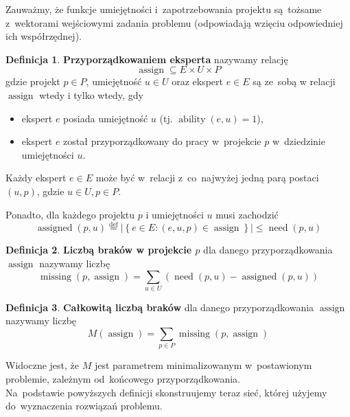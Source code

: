 \documentclass[12pt,a4paper]{article}
\theoremstyle{definition}
\newtheorem{defn}{Definicja}
\DeclareMathOperator{\ability}{ability}
\DeclareMathOperator{\need}{need}
\DeclareMathOperator{\assign}{assign}
\DeclareMathOperator{\assigned}{assigned}
\DeclareMathOperator{\missing}{missing}
\begin{document}
\noindent
Zauważmy, że funkcje umiejętności i~zapotrzebowania projektu są~tożsame
z~wektorami wejściowymi zadania problemu (odpowiadają wzięciu odpowiedniej
ich współrzędnej).

\begin{defn}
\label{defn:assign}
\textbf{Przyporządkowaniem eksperta} nazywamy relację
$$ \assign \subseteq E \times U \times P $$
gdzie projekt $p \in P$, umiejętność $u \in U$ oraz ekspert $e \in E$ są
ze~sobą w relacji $\assign$ wtedy i tylko wtedy, gdy
\begin{itemize}
	\item ekspert $e$ posiada umiejętność $u$ (tj. $\ability(e,u) = 1$),
	\item ekspert $e$ został przyporządkowany do pracy w~projekcie $p$
	w~dziedzinie umiejętności $u$.
\end{itemize}
Każdy ekspert $e \in E$ może być w~relacji z~co~najwyżej jedną parą postaci
$(u,p)$, gdzie $u \in U, p \in P$.

\noindent
Ponadto, dla każdego projektu $p$ i umiejętności $u$ musi zachodzić
$$\assigned(p,u) \overset{\text{def}}{=} \left| \left\lbrace e \in E : (e,u,p)
\in \assign \right\rbrace \right| \leq \need(p,u)$$
\end{defn}

\begin{defn}
\label{defn:missing}
\textbf{Liczbą braków w projekcie $p$} dla danego przyporządkowania $\assign$
nazywamy liczbę
$$ \missing(p,\assign) = \sum_{u \in U} \left( \need(p,u) - 
\assigned(p, u)\right) $$
\end{defn}

\begin{defn}
\textbf{Całkowitą liczbą braków} dla danego przyporządkowania $\assign$ nazywamy
liczbę
$$ M(\assign) = \sum_{p \in P} \missing(p, \assign) $$
\end{defn}

\noindent
Widoczne jest, że $M$ jest parametrem minimalizowanym w~postawionym problemie,
zależnym od~końcowego przyporządkowania.\\

\noindent
Na~podstawie powyższych definicji skonstruujemy teraz sieć, której użyjemy
do~wyznaczenia rozwiązań problemu.
\end{document}
